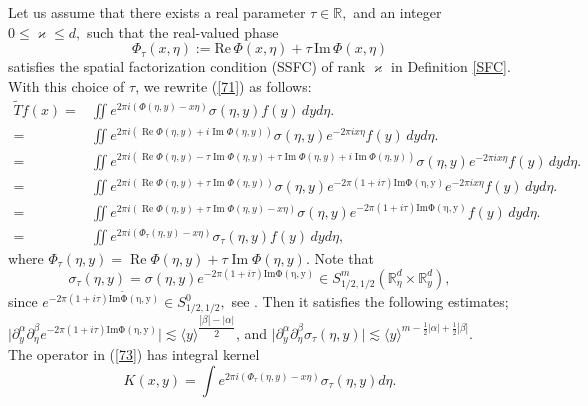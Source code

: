 \documentclass[12pt, reqno]{amsart}
\renewcommand{\Im}{\mathrm{Im}\,}
\renewcommand{\Re}{\mathrm{Re}\,}
\theoremstyle{definition}
\theoremstyle{remark}
\numberwithin{equation}{section}
\begin{document}
Let us assume that there exists a real parameter $\tau\in\mathbb{R},$ and an integer
$0\le \varkappa\le d,$ such that the real-valued phase
\[
\Phi_\tau(x,\eta):=\Re\Phi(x,\eta)+\tau\,\Im\Phi(x,\eta)
\]
satisfies the spatial factorization condition (SSFC) of rank $\varkappa$ in Definition \ref{SFC}.
    With this choice of $\tau$, we rewrite (\ref{71})  as follows:
     \begin{align}
     \tilde{T}f(x)=&\displaystyle{\iint} e^{2\pi i (\Phi(\eta,y)-x\eta)}\sigma(\eta,y)f(y)\,dyd\eta.\nonumber\\
     =&\displaystyle{\iint} e^{2\pi i(\operatorname{Re}\Phi(\eta,y)+i\operatorname{Im}\Phi(\eta,y))}\sigma(\eta,y)e^{-2\pi ix\eta}f(y)\,dyd\eta.\nonumber\\
     =&\displaystyle{\iint} e^{2\pi i(\operatorname{Re}\Phi(\eta,y)-\tau\operatorname{Im}\Phi(\eta,y)+\tau\operatorname{Im}\Phi(\eta,y)+i\operatorname{Im}\Phi(\eta,y))}\sigma(\eta,y)e^{-2\pi ix\eta}f(y)\,dyd\eta.\nonumber\\
     =&\displaystyle{\iint} e^{2\pi i(\operatorname{Re}\Phi(\eta,y)+\tau\operatorname{Im}\Phi(\eta,y))}\sigma(\eta,y)e^{-2\pi(1+i\tau)\operatorname{Im\Phi(\eta,y)}}e^{-2\pi ix\eta}f(y)\,dyd\eta.\nonumber\\
     =&\displaystyle{\iint} e^{2\pi i(\operatorname{Re}\Phi(\eta,y)+\tau\operatorname{Im}\Phi(\eta,y)-x\eta)}\sigma(\eta,y)e^{-2\pi(1+i\tau)\operatorname{Im\Phi(\eta,y)}}f(y)\,dyd\eta.\nonumber\\
     =&\displaystyle{\iint} e^{2\pi i(\Phi_{\tau}(\eta,y)-x\eta)}\sigma_{\tau}(\eta,y)f(y)\,dyd\eta,
     \label{73}
     \end{align}
     where  $\Phi_{\tau}(\eta,y)=\operatorname{Re}\Phi(\eta,y)+\tau\operatorname{Im}\Phi(\eta,y)$. Note that $$\sigma_{\tau}(\eta,y)=\sigma(\eta,y)e^{-2\pi(1+i\tau)\operatorname{Im\Phi(\eta,y)}}\in S^m_{1/2,1/2}(\mathbb{R}^d_\eta\times \mathbb{R}^d_y),$$ since  $e^{-2\pi(1+i\tau)\operatorname{Im\tilde{\Phi}(\eta,y)}}\in S^0_{1/2,1/2},$ see \cite[Page 28]{Ruz2001}.  Then it satisfies the following estimates; \\
     $\big|\partial_y^\alpha\partial_{\eta}^\beta e^{-2\pi(1+i\tau)\operatorname{Im\Phi(\eta,y)}}\big|\lesssim \langle y \rangle^{\dfrac{|\beta|-|\alpha|}{2}}$,  and 
     $\big|\partial_y^\alpha\partial_{\eta}^\beta \sigma_\tau(\eta,y) \big|\lesssim \langle y \rangle^{m-\frac{1}{2}|\alpha|+\frac{1}{2}|\beta|}$.\\
     The operator in (\ref{73}) has integral kernel
     \begin{equation}
         K(x,y)= \displaystyle{\int} e^{2\pi i(\Phi_{\tau}(\eta,y)-x\eta)}\sigma_{\tau}(\eta,y)d\eta.
     \end{equation}
\end{document}
